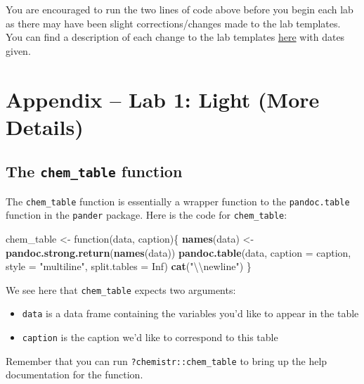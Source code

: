 \documentclass[]{tufte-book}
\newenvironment{Shaded}{\begin{snugshade}}{\end{snugshade}}
\newcommand{\KeywordTok}[1]{\textcolor[rgb]{0.13,0.29,0.53}{\textbf{{#1}}}}
\newcommand{\DataTypeTok}[1]{\textcolor[rgb]{0.13,0.29,0.53}{{#1}}}
\newcommand{\CharTok}[1]{\textcolor[rgb]{0.31,0.60,0.02}{{#1}}}
\newcommand{\StringTok}[1]{\textcolor[rgb]{0.31,0.60,0.02}{{#1}}}
\newcommand{\OtherTok}[1]{\textcolor[rgb]{0.56,0.35,0.01}{{#1}}}
\newcommand{\NormalTok}[1]{{#1}}
\providecommand{\tightlist}{%
  \setlength{\itemsep}{0pt}\setlength{\parskip}{0pt}}
\begin{document}
You are encouraged to run the two lines of code above before you begin
each lab as there may have been slight corrections/changes made to the
lab templates. You can find a description of each change to the lab
templates
\href{https://github.com/ismayc/chemistr/blob/master/NEWS.md}{here} with
dates given.

\chapter{Appendix -- Lab 1: Light (More Details)}\label{appendix-light}

\section{\texorpdfstring{The \texttt{chem\_table}
function}{The chem\_table function}}\label{the-chemux5ftable-function}

The \texttt{chem\_table} function is essentially a wrapper function to
the \texttt{pandoc.table} function in the \texttt{pander} package. Here
is the code for \texttt{chem\_table}:

\begin{Shaded}
\begin{Highlighting}[]
\NormalTok{chem_table <-}\StringTok{ }\NormalTok{function(data, caption)\{}
  \KeywordTok{names}\NormalTok{(data) <-}\StringTok{ }\KeywordTok{pandoc.strong.return}\NormalTok{(}\KeywordTok{names}\NormalTok{(data))}
  \KeywordTok{pandoc.table}\NormalTok{(data, }\DataTypeTok{caption =} \NormalTok{caption, }\DataTypeTok{style =} \StringTok{"multiline"}\NormalTok{,}
               \DataTypeTok{split.tables =} \OtherTok{Inf}\NormalTok{)}
  \KeywordTok{cat}\NormalTok{(}\StringTok{"}\CharTok{\textbackslash{}\textbackslash{}}\StringTok{newline"}\NormalTok{)}
\NormalTok{\}}
\end{Highlighting}
\end{Shaded}

We see here that \texttt{chem\_table} expects two arguments:

\begin{itemize}
\tightlist
\item
  \texttt{data} is a data frame containing the variables you'd like to
  appear in the table
\item
  \texttt{caption} is the caption we'd like to correspond to this table
\end{itemize}

Remember that you can run \texttt{?chemistr::chem\_table} to bring up
the help documentation for the function.
\end{document}
